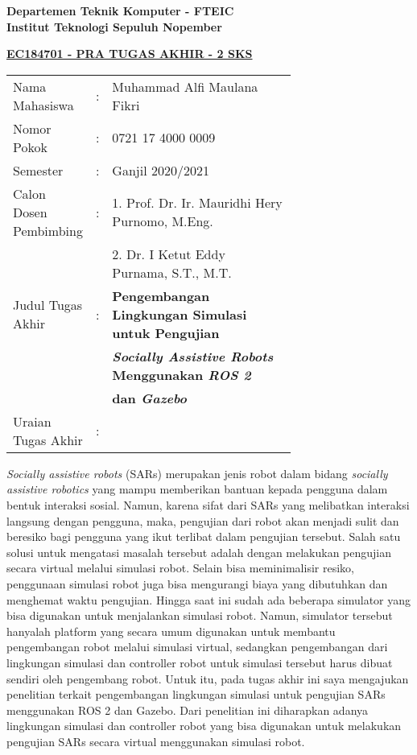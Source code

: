 \begin{flushleft}
  \textbf{Departemen Teknik Komputer - FTEIC}\\
  \textbf{Institut Teknologi Sepuluh Nopember}\\
\end{flushleft}

\begin{center}
  \underline{\textbf{EC184701 - PRA TUGAS AKHIR - 2 SKS}}
\end{center}

\begin{adjustwidth}{-0.2cm}{}
  \begin{tabular}{lcp{0.7\linewidth}}

    Nama Mahasiswa &:& Muhammad Alfi Maulana Fikri \\
    Nomor Pokok &:&	0721 17 4000 0009 \\

    Semester &:& Ganjil 2020/2021 \\

    Calon Dosen Pembimbing &:& 1. Prof. Dr. Ir. Mauridhi Hery Purnomo, M.Eng. \\
    & & 2. Dr. I Ketut Eddy Purnama, S.T., M.T. \\

    Judul Tugas Akhir &:& \textbf{Pengembangan Lingkungan Simulasi untuk Pengujian} \\
    & & \textbf{\emph{Socially Assistive Robots} Menggunakan \emph{ROS 2}} \\
    & & \textbf{dan \emph{Gazebo}} \\

    Uraian Tugas Akhir &:& \\
  \end{tabular}
\end{adjustwidth}

\emph{Socially assistive robots} (SARs) merupakan jenis robot dalam bidang \emph{socially assistive robotics} yang mampu memberikan bantuan kepada pengguna dalam bentuk interaksi sosial.
Namun, karena sifat dari SARs yang melibatkan interaksi langsung dengan pengguna, maka, pengujian dari robot akan menjadi sulit dan beresiko bagi pengguna yang ikut terlibat dalam pengujian tersebut.
Salah satu solusi untuk mengatasi masalah tersebut adalah dengan melakukan pengujian secara virtual melalui simulasi robot.
Selain bisa meminimalisir resiko, penggunaan simulasi robot juga bisa mengurangi biaya yang dibutuhkan dan menghemat waktu pengujian.
Hingga saat ini sudah ada beberapa simulator yang bisa digunakan untuk menjalankan simulasi robot.
Namun, simulator tersebut hanyalah platform yang secara umum digunakan untuk membantu pengembangan robot melalui simulasi virtual, sedangkan pengembangan dari lingkungan simulasi dan controller robot untuk simulasi tersebut harus dibuat sendiri oleh pengembang robot.
Untuk itu, pada tugas akhir ini saya mengajukan penelitian terkait pengembangan lingkungan simulasi untuk pengujian SARs menggunakan ROS 2 dan Gazebo.
Dari penelitian ini diharapkan adanya lingkungan simulasi dan controller robot yang bisa digunakan untuk melakukan pengujian SARs secara virtual menggunakan simulasi robot.
\vspace{1ex}

